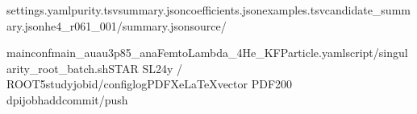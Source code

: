\documentclass[10pt,a4paper]{article}
\begin{document}
\hspace{0pt}{\jpfont 再現ファイル：同梱}\hspace{0pt}settings.yaml\hspace{0pt}{\jpfont 、}\hspace{0pt}purity.tsv\hspace{0pt}{\jpfont 、}\hspace{0pt}summary.json\hspace{0pt}{\jpfont 、}\hspace{0pt}coefficients.json\hspace{0pt}{\jpfont 、}\hspace{0pt}examples.tsv\hspace{0pt}{\jpfont 。元は}\hspace{0pt}candidate\_\allowbreak{}summary.json\hspace{0pt}{\jpfont と}\hspace{0pt}he4\_\allowbreak{}r061\_\allowbreak{}001/\allowbreak{}summary.json\hspace{0pt}{\jpfont 。再現ツールは同梱}\hspace{0pt}source/\allowbreak{}\hspace{0pt}{\jpfont に保存。}\hspace{0pt}

mainconf\hspace{0pt}{\jpfont ：}\hspace{0pt}main\_\allowbreak{}auau3p85\_\allowbreak{}anaFemtoLambda\_\allowbreak{}4He\_\allowbreak{}KFParticle.yaml\hspace{0pt}{\jpfont 。描画は}\hspace{0pt}script/\allowbreak{}singularity\_\allowbreak{}root\_\allowbreak{}batch.sh\hspace{0pt}{\jpfont 経由の}\hspace{0pt}STAR SL24y /\allowbreak{} ROOT5\hspace{0pt}{\jpfont 。ローカル}\hspace{0pt}study\hspace{0pt}{\jpfont のため新規}\hspace{0pt}jobid/\allowbreak{}configlog\hspace{0pt}{\jpfont なし。}\hspace{0pt}PDF\hspace{0pt}{\jpfont 組版は}\hspace{0pt}XeLaTeX\hspace{0pt}{\jpfont 。図の}\hspace{0pt}vector PDF\hspace{0pt}{\jpfont と}\hspace{0pt}200 dpi\hspace{0pt}{\jpfont 画像を両方保存。}\hspace{0pt}job\hspace{0pt}{\jpfont 投入・}\hspace{0pt}hadd\hspace{0pt}{\jpfont ・}\hspace{0pt}commit/\allowbreak{}push\hspace{0pt}{\jpfont なし。}\hspace{0pt}
\end{document}
